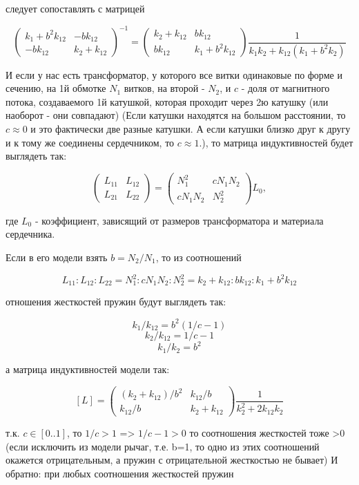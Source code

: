 \documentclass[11pt]{article} %
\begin{document}
следует сопоставлять с матрицей

$$\begin{pmatrix}
k_1+b^2k_{12}	& -bk_{12}	\\
-bk_{12}        &k_2+k_{12}
\end{pmatrix}^{-1}=
\begin{pmatrix}
k_2+k_{12}	& bk_{12}	\\
bk_{12}		& k_1+b^2k_{12}	
\end{pmatrix}
\frac{1}{k_1k_2+k_{12}(k_1+b^2k_2)}
$$

И если у нас есть трансформатор, у которого все витки одинаковые по форме и сечению, на 1й обмотке $N_1$ витков, на второй - $N_2$, и $c$ - доля от магнитного потока, создаваемого 1й катушкой, которая проходит через 2ю катушку (или наоборот - они совпадают) (Если катушки находятся на большом расстоянии, то $c\approx0$ и это фактически две разные катушки. А если катушки близко друг к другу и к тому же соединены сердечником, то $c\approx1$.), то матрица индуктивностей будет выглядеть так:

$$\begin{pmatrix}
L_{11} & L_{12}\\
L_{21} & L_{22}
\end{pmatrix}=\begin{pmatrix}
N_1^2	  & cN_1N_2\\
cN_1N_2 & N_2^2	 
\end{pmatrix}
L_0,
$$

где $L_0$ - коэффициент, зависящий от размеров трансформатора и материала сердечника.

Если в его модели взять $b=N_2/N_1$, то из соотношений

$$L_{11}:L_{12}:L_{22} = N_1^2:cN_1N_2:N_2^2 = k_2+k_{12}:bk_{12}:k_1+b^2k_{12}$$

отношения жесткостей пружин будут выглядеть так:

$$k_1/k_{12} = b^2(1/c-1)$$
$$k_2/k_{12} = 1/c-1$$
$$k_1/k_2 = b^2$$

а матрица индуктивностей модели так:

$$[L] = 
\begin{pmatrix}
(k_2+k_{12})/b^2	& k_{12}/b	\\
k_{12}/b		& k_2+k_{12}	
\end{pmatrix}
\frac{1}{k_2^2+2k_{12}k_2}
$$


т.к. $c \in [0..1]$, то $1/c>1$ => $1/c-1>0$
то соотношения жесткостей тоже >0 (если исключить из модели рычаг, т.е. b=1, то одно из этих соотношений окажется отрицательным, а пружин с отрицательной жесткостью не бывает)
И обратно: при любых соотношения жесткостей пружин
\end{document}
